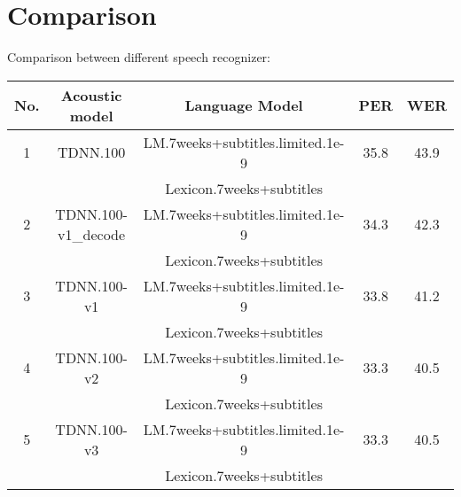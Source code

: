 


\section{Comparison}

Comparison between different speech recognizer:
\begin{center}
\label{wmerAM0s1}
\begin{tabular}{ | c | c | c |  c | c |  }
\hline
\textbf{No.} & \textbf{Acoustic model} & \textbf{Language Model}  &  \textbf{PER}  & \textbf{WER}  \\ \hline \hline
1 & TDNN.100  & LM.7weeks+subtitles.limited.1e-9 & 35.8  & 43.9 \\ 
& & Lexicon.7weeks+subtitles  & & \\ \hline


2 & TDNN.100-v1\_decode   & LM.7weeks+subtitles.limited.1e-9  & 34.3    & 42.3 \\
&  & Lexicon.7weeks+subtitles & & \\ \hline

3 & TDNN.100-v1   & LM.7weeks+subtitles.limited.1e-9  & 33.8   & 41.2 \\
&  & Lexicon.7weeks+subtitles & & \\ \hline


4 & TDNN.100-v2   & LM.7weeks+subtitles.limited.1e-9  & 33.3    & 40.5 \\
&  & Lexicon.7weeks+subtitles & & \\ \hline

5 & TDNN.100-v3   & LM.7weeks+subtitles.limited.1e-9  & 33.3    & 40.5 \\
&  & Lexicon.7weeks+subtitles & & \\ \hline
\end{tabular}
\end{center}


